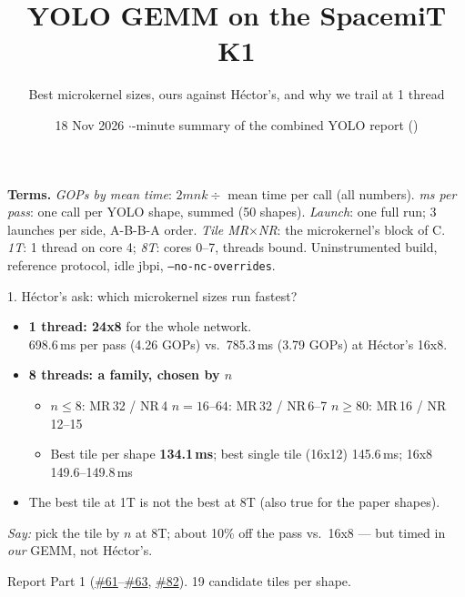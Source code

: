 \documentclass[aspectratio=169,11pt]{beamer}
\title{YOLO GEMM on the SpacemiT K1}
\subtitle{Best microkernel sizes, ours against H\'ector's, and why we trail at 1 thread}
\date{18 Nov 2026 \quad$\cdot$\quad 3-minute summary of the combined YOLO report (\iss{58})}
\newcommand{\iss}[1]{\href{https://github.com/JieGH/RVV_code_gen_via_MLIR_xDSL/issues/#1}{\##1}}
\newcommand{\src}[1]{\par\vfill{\tiny\color{muted}#1\par}}
\newcommand{\say}[1]{{\small\color{muted}\emph{Say:} #1}}
\begin{document}
\begin{frame}
\titlepage
\vfill
{\scriptsize\color{muted}
\textbf{Terms.} \emph{GOPs by mean time}: $2mnk \div$ mean time per call (all numbers).
\emph{ms per pass}: one call per YOLO shape, summed (50 shapes).
\emph{Launch}: one full run; 3 launches per side, A-B-B-A order.
\emph{Tile MR$\times$NR}: the microkernel's block of C.
\emph{1T}: 1 thread on core 4; \emph{8T}: cores 0--7, threads bound.
Uninstrumented build, reference protocol, idle jbpi, \texttt{--no-nc-overrides}.\par}
\end{frame}

\begin{frame}{1. H\'ector's ask: which microkernel sizes run fastest?}
\begin{itemize}
\item \textbf{1 thread: 24x8} for the whole network.\\
  698.6\,ms per pass (4.26 GOPs) vs.\ 785.3\,ms (3.79 GOPs) at H\'ector's 16x8.
\item \textbf{8 threads: a family, chosen by $n$}
  \begin{itemize}
  \item $n \le 8$: MR\,32 / NR\,4 \quad $n = 16$--$64$: MR\,32 / NR\,6--7 \quad $n \ge 80$: MR\,16 / NR\,12--15
  \item Best tile per shape \textbf{134.1\,ms}; best single tile (16x12) 145.6\,ms; 16x8 149.6--149.8\,ms
  \end{itemize}
\item The best tile at 1T is not the best at 8T (also true for the paper shapes).
\end{itemize}
\vspace{4pt}
\say{pick the tile by $n$ at 8T; about 10\% off the pass vs.\ 16x8 --- but timed in \emph{our} GEMM, not H\'ector's.}
\src{Report Part 1 (\iss{61}--\iss{63}, \iss{82}). 19 candidate tiles per shape.}
\end{frame}
\end{document}
